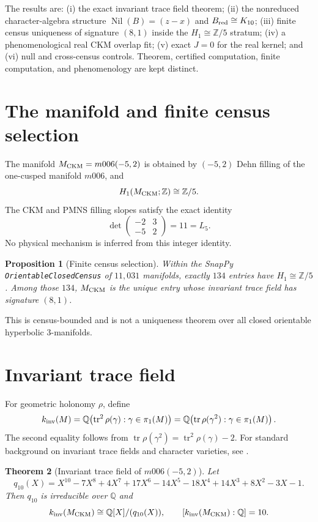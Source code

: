\documentclass[11pt]{article}
\newtheorem{theorem}{Theorem}[section]\newtheorem{proposition}[theorem]{Proposition}
\newcommand{\Q}{\mathbb Q}\newcommand{\Z}{\mathbb Z}\newcommand{\C}{\mathbb C}
\newcommand{\M}{M_{\rm CKM}}\newcommand{\K}{K_{10}}\newcommand{\kinv}{k_{\rm inv}}
\begin{document}
The results are: (i) the exact invariant trace field theorem; (ii) the
nonreduced character-algebra structure
$\operatorname{Nil}(B)=(z-x)$ and $B_{\rm red}\cong K_{10}$; (iii) finite
census uniqueness of signature $(8,1)$ inside the $H_1\cong\Z/5$ stratum;
(iv) a phenomenological real CKM overlap fit; (v) exact $J=0$ for the real
kernel; and (vi) null and cross-census controls. Theorem, certified
computation, finite computation, and phenomenology are kept distinct.

\section{The manifold and finite census selection}
The manifold $\M=m006(-5,2)$ is obtained by $(-5,2)$ Dehn filling of the
one-cusped manifold $m006$, and
\[
H_1(\M;\Z)\cong\Z/5.
\]
The CKM and PMNS filling slopes satisfy the exact identity
\[
\det\begin{pmatrix}-2&3\\-5&2\end{pmatrix}=11=L_5.
\]
No physical mechanism is inferred from this integer identity.

\begin{proposition}[Finite census selection]
Within the SnapPy \texttt{OrientableClosedCensus} of $11{,}031$ manifolds,
exactly $134$ entries have $H_1\cong\Z/5$. Among those $134$, $\M$ is the
unique entry whose invariant trace field has signature $(8,1)$.
\end{proposition}
\begin{remark}
This is census-bounded and is not a uniqueness theorem over all closed
orientable hyperbolic $3$-manifolds.
\end{remark}

\section{Invariant trace field}\label{sec:itf}
For geometric holonomy $\rho$, define
\[
\kinv(M)
=
\Q\!\left(\operatorname{tr}^2\rho(\gamma):\gamma\in\pi_1(M)\right)
=
\Q\!\left(\operatorname{tr}\rho(\gamma^2):\gamma\in\pi_1(M)\right).
\]
The second equality follows from
$\operatorname{tr}\rho(\gamma^2)=\operatorname{tr}^2\rho(\gamma)-2$.
For standard background on invariant trace fields and character varieties,
see \cite{MaclachlanReid,LongReid,Zhang}.
\begin{theorem}[Invariant trace field of $m006(-5,2)$]\label{thm:itf}
Let
\[
q_{10}(X)=X^{10}-7X^8+4X^7+17X^6-14X^5-18X^4+14X^3+8X^2-3X-1.
\]
Then $q_{10}$ is irreducible over $\Q$ and
\[
\kinv(\M)\cong\Q[X]/(q_{10}(X)),\qquad [\kinv(\M):\Q]=10.
\]
\end{theorem}
\end{document}
